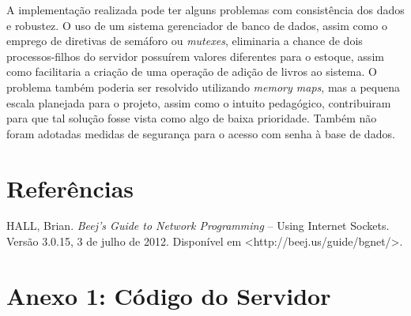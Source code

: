 \documentclass[11pt, brazil]{article} %
\begin{document}
A implementação realizada pode ter alguns problemas com consistência dos dados e robustez. O uso de um sistema gerenciador de banco de dados, assim como o emprego de diretivas de semáforo ou \emph{mutexes}, eliminaria a chance de dois processos-filhos do servidor possuírem valores diferentes para o estoque, assim como facilitaria a criação de uma operação de adição de livros ao sistema. O problema também poderia ser resolvido utilizando \emph{memory maps}, mas a pequena escala planejada para o projeto, assim como o intuito pedagógico, contribuiram para que tal solução fosse vista como algo de baixa prioridade. Também não foram adotadas medidas de segurança para o acesso com senha à base de dados.

\section{Referências}

HALL, Brian. \emph{Beej's Guide to Network Programming} -- Using Internet Sockets. Versão 3.0.15, 3 de julho de 2012. Disponível em <http://beej.us/guide/bgnet/>.

\section*{Anexo 1: Código do Servidor}
\end{document}
